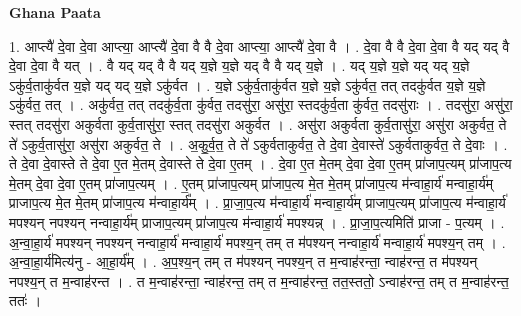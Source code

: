 \documentclass[17pt]{extarticle}
\begin{document}
\textbf{Ghana Paata } \newline

1. आप्त्यै॑ दे॒वा दे॒वा आप्त्या॒ आप्त्यै॑ दे॒वा वै वै दे॒वा आप्त्या॒ आप्त्यै॑ दे॒वा वै । . दे॒वा वै वै दे॒वा दे॒वा वै यद् यद् वै दे॒वा दे॒वा वै यत् । . वै यद् यद् वै वै यद् य॒ज्ञे य॒ज्ञे यद् वै वै यद् य॒ज्ञे । . यद् य॒ज्ञे य॒ज्ञे यद् यद् य॒ज्ञे ऽकु॑र्व॒ताकु॑र्वत य॒ज्ञे यद् यद् य॒ज्ञे ऽकु॑र्वत । . य॒ज्ञे ऽकु॑र्व॒ताकु॑र्वत य॒ज्ञे य॒ज्ञे ऽकु॑र्वत॒ तत् तदकु॑र्वत य॒ज्ञे य॒ज्ञे ऽकु॑र्वत॒ तत् । . अकु॑र्वत॒ तत् तदकु॑र्व॒ता कु॑र्वत॒ तदसु॑रा॒ असु॑रा॒ स्तदकु॑र्व॒ता कु॑र्वत॒ तदसु॑राः । . तदसु॑रा॒ असु॑रा॒ स्तत् तदसु॑रा अकुर्वता कुर्व॒तासु॑रा॒ स्तत् तदसु॑रा अकुर्वत । . असु॑रा अकुर्वता कुर्व॒तासु॑रा॒ असु॑रा अकुर्वत॒ ते ते॑ ऽकुर्व॒तासु॑रा॒ असु॑रा अकुर्वत॒ ते । . अ॒कु॒र्व॒त॒ ते ते॑ ऽकुर्वताकुर्वत॒ ते दे॒वा दे॒वास्ते॑ ऽकुर्वताकुर्वत॒ ते दे॒वाः । . ते दे॒वा दे॒वास्ते ते दे॒वा ए॒त मे॒तम् दे॒वास्ते ते दे॒वा ए॒तम् । . दे॒वा ए॒त मे॒तम् दे॒वा दे॒वा ए॒तम् प्रा॑जाप॒त्यम् प्रा॑जाप॒त्य मे॒तम् दे॒वा दे॒वा ए॒तम् प्रा॑जाप॒त्यम् । . ए॒तम् प्रा॑जाप॒त्यम् प्रा॑जाप॒त्य मे॒त मे॒तम् प्रा॑जाप॒त्य म॑न्वाहा॒र्य॑ मन्वाहा॒र्य॑म् प्राजाप॒त्य मे॒त मे॒तम् प्रा॑जाप॒त्य म॑न्वाहा॒र्य᳚म् । . प्रा॒जा॒प॒त्य म॑न्वाहा॒र्य॑ मन्वाहा॒र्य॑म् प्राजाप॒त्यम् प्रा॑जाप॒त्य म॑न्वाहा॒र्य॑ मपश्यन् नपश्यन् नन्वाहा॒र्य॑म् प्राजाप॒त्यम् प्रा॑जाप॒त्य म॑न्वाहा॒र्य॑ मपश्यन्न् । . प्रा॒जा॒प॒त्यमिति॑ प्राजा - प॒त्यम् । . अ॒न्वा॒हा॒र्य॑ मपश्यन् नपश्यन् नन्वाहा॒र्य॑ मन्वाहा॒र्य॑ मपश्य॒न् तम् त म॑पश्यन् नन्वाहा॒र्य॑ मन्वाहा॒र्य॑ मपश्य॒न् तम् । . अ॒न्वा॒हा॒र्य॑मित्य॑नु - आ॒हा॒र्य᳚म् । . अ॒प॒श्य॒न् तम् त म॑पश्यन् नपश्य॒न् त म॒न्वाह॑रन्ता॒ न्वाह॑रन्त॒ त म॑पश्यन् नपश्य॒न् त म॒न्वाह॑रन्त । . त म॒न्वाह॑रन्ता॒ न्वाह॑रन्त॒ तम् त म॒न्वाह॑रन्त॒ तत॒स्ततो॒ ऽन्वाह॑रन्त॒ तम् त म॒न्वाह॑रन्त॒ ततः॑ । \newline
\end{document}
